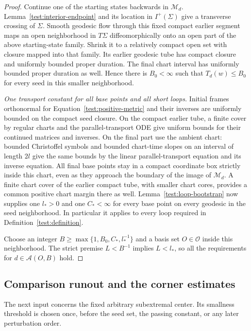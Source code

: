 \begin{proof}
Continue one of the starting states backwards in $\mathcal M_d$.
Lemma~\ref{test:interior-endpoint} and its location in $I^+(\Sigma)$
give a transverse crossing of $\Sigma$. Smooth geodesic flow through
this fixed compact earlier segment maps an open neighborhood in
$T\Sigma$ diffeomorphically onto an open part of the above
starting-state family. Shrink it to a relatively compact open set
with closure mapped into that family. Its earlier geodesic tube has
compact closure and uniformly bounded proper duration. The final
chart interval has uniformly bounded proper duration as well. Hence
there is $B_0<\infty$ such that $T_d(w)\le B_0$ for every seed
in this smaller neighborhood.

\emph{One transport constant for all base points and all short loops.}
Initial frames orthonormal for Equation~\eqref{test:positive-metric}
and their inverses are uniformly bounded on the compact seed closure.
On the compact earlier tube, a finite cover by regular charts and
the parallel-transport ODE give uniform bounds for their continued
matrices and inverses. On the final part use the ambient chart:
bounded Christoffel symbols and bounded chart-time slopes on an
interval of length $2l$ give the same bounds by the linear
parallel-transport equation and its inverse equation. All final base
points stay in a compact coordinate box strictly inside this chart,
even as they approach the boundary of the image of $\mathcal M_d$.
A finite chart cover of the earlier compact tube, with smaller chart
cores, provides a common positive chart margin there as well.
Lemma~\ref{test:loop-bootstrap} now supplies one $l_*>0$ and one
$C_*<\infty$ for every base point on every geodesic in the seed
neighborhood. In particular it applies to every loop required in
Definition~\ref{test:definition}.

Choose an integer $B\ge\max\{1,B_0,C_*,l_*^{-1}\}$ and a
basis set $O\in\mathcal O$ inside this neighborhood. The strict
premise $L<B^{-1}$ implies $L<l_*$, so all the requirements for
$d\in\mathcal A(O,B)$ hold.
\end{proof}

\subsection{Comparison runout and the corner estimates}

The next input concerns the fixed arbitrary subextremal center. Its
smallness threshold is chosen once, before the seed set, the passing
constant, or any later perturbation order.

